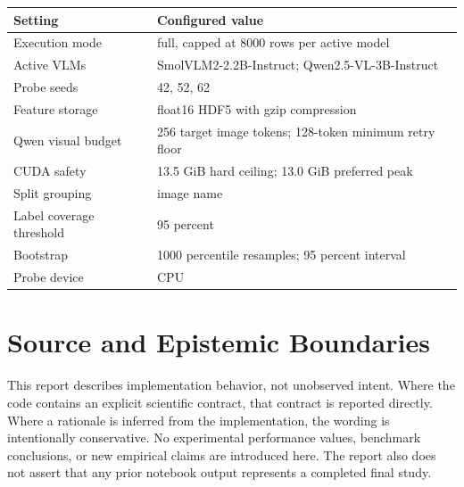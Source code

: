 \documentclass[11pt,a4paper]{article}
\begin{document}
\begin{table}[h]

\centering

\begin{tabular}{L{0.34\textwidth}L{0.50\textwidth}}

\toprule

\textbf{Setting} & \textbf{Configured value}\\\midrule

Execution mode & full, capped at 8000 rows per active model\\

Active VLMs & SmolVLM2-2.2B-Instruct; Qwen2.5-VL-3B-Instruct\\

Probe seeds & 42, 52, 62\\

Feature storage & float16 HDF5 with gzip compression\\

Qwen visual budget & 256 target image tokens; 128-token minimum retry floor\\

CUDA safety & 13.5 GiB hard ceiling; 13.0 GiB preferred peak\\

Split grouping & image name\\

Label coverage threshold & 95 percent\\

Bootstrap & 1000 percentile resamples; 95 percent interval\\

Probe device & CPU\\

\bottomrule

\end{tabular}

\end{table}

\section{Source and Epistemic Boundaries}

This report describes implementation behavior, not unobserved intent. Where the code contains an explicit scientific contract, that contract is reported directly. Where a rationale is inferred from the implementation, the wording is intentionally conservative. No experimental performance values, benchmark conclusions, or new empirical claims are introduced here. The report also does not assert that any prior notebook output represents a completed final study.
\end{document}
